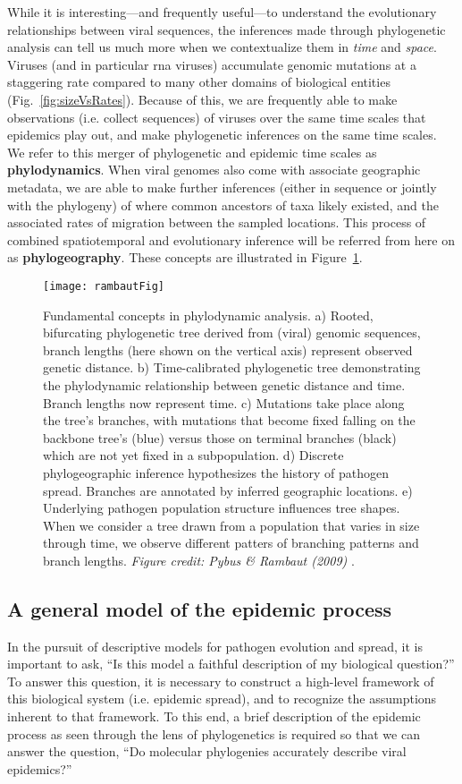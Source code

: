 While it is interesting---and frequently useful---to understand the evolutionary relationships between viral sequences, the inferences made through phylogenetic analysis can tell us much more when we contextualize them in \textit{time} and \textit{space}.
Viruses (and in particular \gls{rna} viruses) accumulate genomic mutations at a staggering rate compared to many other domains of biological entities (Fig.~\ref{fig:sizeVsRates}).
Because of this, we are frequently able to make observations (i.e. collect sequences) of viruses over the same time scales that epidemics play out, and make phylogenetic inferences on the same time scales.
We refer to this merger of phylogenetic and epidemic time scales as \textbf{phylodynamics}.
When viral genomes also come with associate geographic metadata, we are able to make further inferences (either in sequence or jointly with the phylogeny) of where common ancestors of taxa likely existed, and the associated rates of migration between the sampled locations.
This process of combined spatiotemporal and evolutionary inference will be referred from here on as \textbf{phylogeography}.
These concepts are illustrated in Figure~\ref{fig:phylogeneticsOverview}.

\begin{figure}[ht]
  \centering
  \texttt{[image: rambautFig]}
  \caption[Applications of phylodynamics]{Fundamental concepts in phylodynamic analysis. a) Rooted, bifurcating phylogenetic tree derived from (viral) genomic sequences, branch lengths (here shown on the vertical axis) represent observed genetic distance. b) Time-calibrated phylogenetic tree demonstrating the phylodynamic relationship between genetic distance and time. Branch lengths now represent time. c) Mutations take place along the tree's branches, with mutations that become fixed falling on the backbone tree's (blue) versus those on terminal branches (black) which are not yet fixed in a subpopulation. d) Discrete phylogeographic inference hypothesizes the history of pathogen spread. Branches are annotated by inferred geographic locations. e) Underlying pathogen population structure influences tree shapes. When we consider a tree drawn from a population that varies in size through time, we observe different patters of branching patterns and branch lengths.
  \textit{Figure credit: Pybus \& Rambaut (2009)} \citep{pybus2009evolutionary}.
  }
  \label{fig:phylogeneticsOverview}
\end{figure}

\subsection{A general model of the epidemic process}
In the pursuit of descriptive models for pathogen evolution and spread, it is important to ask, ``Is this model a faithful description of my biological question?''
To answer this question, it is necessary to construct a high-level framework of this biological system (i.e. epidemic spread), and to recognize the assumptions inherent to that framework.
To this end, a brief description of the epidemic process as seen through the lens of phylogenetics is required so that we can answer the question, ``Do molecular phylogenies accurately describe viral epidemics?''

